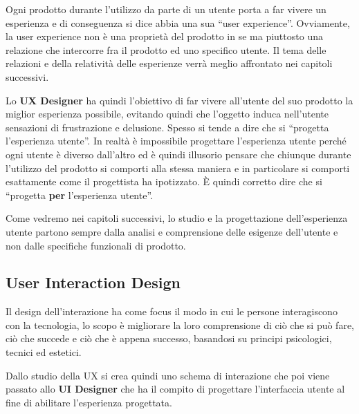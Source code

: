 
Ogni prodotto durante l'utilizzo da parte di un utente porta a far vivere un esperienza e di conseguenza si dice abbia una sua ``user experience''. Ovviamente, la user experience non è una proprietà del prodotto in se ma piuttosto una relazione che intercorre fra il prodotto ed uno specifico utente. Il tema delle relazioni e della relatività delle esperienze verrà meglio affrontato nei capitoli successivi. 


Lo \textbf{UX Designer} ha quindi l'obiettivo di far vivere all'utente del suo prodotto la miglior esperienza possibile, evitando quindi che l'oggetto induca nell'utente sensazioni di frustrazione e delusione.
Spesso si tende a dire che si ``progetta l'esperienza utente''. In realtà è impossibile progettare l'esperienza utente perché ogni utente è diverso dall'altro ed è quindi illusorio pensare che chiunque durante l'utilizzo del prodotto si comporti alla stessa maniera e in particolare si comporti esattamente come il progettista ha ipotizzato.
È quindi corretto dire che si ``progetta \textbf{per} l'esperienza utente''.

Come vedremo nei capitoli successivi, lo studio e la progettazione dell'esperienza utente partono sempre dalla analisi e comprensione delle esigenze dell'utente e non dalle specifiche funzionali di prodotto. 

\subsection{User Interaction Design}
Il design dell'interazione ha come focus il modo in cui le persone interagiscono con la tecnologia, lo scopo è migliorare la loro comprensione di ciò che si può fare, ciò che succede e ciò che è appena successo, basandosi su principi psicologici, tecnici ed estetici.

Dallo studio della UX si crea quindi uno schema di interazione che poi viene passato allo \textbf{UI Designer} che ha il compito di progettare l'interfaccia utente al fine di abilitare l'esperienza progettata.

